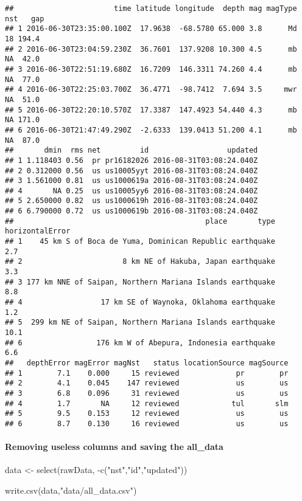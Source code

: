 \documentclass[
]{article}
\newenvironment{Shaded}{\begin{snugshade}}{\end{snugshade}}
\newcommand{\FunctionTok}[1]{\textcolor[rgb]{0.00,0.00,0.00}{#1}}
\newcommand{\NormalTok}[1]{#1}
\newcommand{\OtherTok}[1]{\textcolor[rgb]{0.56,0.35,0.01}{#1}}
\newcommand{\SpecialCharTok}[1]{\textcolor[rgb]{0.00,0.00,0.00}{#1}}
\newcommand{\StringTok}[1]{\textcolor[rgb]{0.31,0.60,0.02}{#1}}
\begin{document}
\begin{verbatim}
##                       time latitude longitude  depth mag magType nst   gap
## 1 2016-06-30T23:35:00.100Z  17.9638  -68.5780 65.000 3.8      Md  18 194.4
## 2 2016-06-30T23:04:59.230Z  36.7601  137.9208 10.300 4.5      mb  NA  42.0
## 3 2016-06-30T22:51:19.680Z  16.7209  146.3311 74.260 4.4      mb  NA  77.0
## 4 2016-06-30T22:25:03.700Z  36.4771  -98.7412  7.694 3.5     mwr  NA  51.0
## 5 2016-06-30T22:20:10.570Z  17.3387  147.4923 54.440 4.3      mb  NA 171.0
## 6 2016-06-30T21:47:49.290Z  -2.6333  139.0413 51.200 4.1      mb  NA  87.0
##       dmin  rms net         id                  updated
## 1 1.118403 0.56  pr pr16182026 2016-08-31T03:08:24.040Z
## 2 0.312000 0.56  us us10005yyt 2016-08-31T03:08:24.040Z
## 3 1.561000 0.81  us us1000619a 2016-08-31T03:08:24.040Z
## 4       NA 0.25  us us10005yy6 2016-08-31T03:08:24.040Z
## 5 2.650000 0.82  us us1000619h 2016-08-31T03:08:24.040Z
## 6 6.790000 0.72  us us1000619b 2016-08-31T03:08:24.040Z
##                                            place       type horizontalError
## 1    45 km S of Boca de Yuma, Dominican Republic earthquake             2.7
## 2                       8 km NE of Hakuba, Japan earthquake             3.3
## 3 177 km NNE of Saipan, Northern Mariana Islands earthquake             8.8
## 4                  17 km SE of Waynoka, Oklahoma earthquake             1.2
## 5  299 km NE of Saipan, Northern Mariana Islands earthquake            10.1
## 6                 176 km W of Abepura, Indonesia earthquake             6.6
##   depthError magError magNst   status locationSource magSource
## 1        7.1    0.000     15 reviewed             pr        pr
## 2        4.1    0.045    147 reviewed             us        us
## 3        6.8    0.096     31 reviewed             us        us
## 4        1.7       NA     12 reviewed            tul       slm
## 5        9.5    0.153     12 reviewed             us        us
## 6        8.7    0.130     16 reviewed             us        us
\end{verbatim}

\hypertarget{removing-useless-columns-and-saving-the-all_data}{%
\paragraph{Removing useless columns and saving the
all\_data}\label{removing-useless-columns-and-saving-the-all_data}}

\begin{Shaded}
\begin{Highlighting}[]
\NormalTok{data }\OtherTok{\textless{}{-}} \FunctionTok{select}\NormalTok{(rawData, }\SpecialCharTok{{-}}\FunctionTok{c}\NormalTok{(}\StringTok{"nst"}\NormalTok{,}\StringTok{"id"}\NormalTok{,}\StringTok{"updated"}\NormalTok{))}

\FunctionTok{write.csv}\NormalTok{(data,}\StringTok{"data/all\_data.csv"}\NormalTok{)}
\end{Highlighting}
\end{Shaded}
\end{document}
